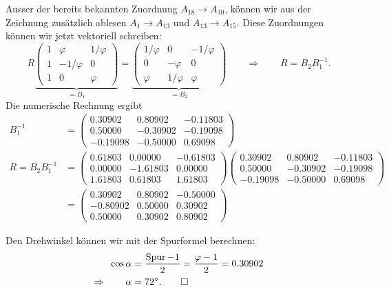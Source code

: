 \begin{loesung}
\begin{teilaufgaben}
\item
Ausser der bereits bekannten Zuordnung $A_{18}\rightarrow A_{10}$,
können wir aus der Zeichnung zusätzlich ablesen
$A_1\rightarrow A_{13}$
und
$A_{13}\rightarrow A_{15}$.
Diese Zuordnungen können wir jetzt vektoriell schreiben:
\begin{equation}
R
\underbrace{
\begin{pmatrix}
1&   \varphi&1/\varphi\\
1&-1/\varphi&        0\\
1&         0&  \varphi
\end{pmatrix}
}_{\displaystyle=B_1}
=
\underbrace{
\begin{pmatrix}
1/\varphi&        0&-1/\varphi\\
        0& -\varphi&         0\\
  \varphi&1/\varphi&   \varphi
\end{pmatrix}
}_{\displaystyle=B_2}
\qquad\Rightarrow\qquad
R=B_2B_1^{-1}.
\label{40000025:b1}
\end{equation}
Die numerische Rechnung ergibt
\begin{align*}
B_1^{-1}
&=
\begin{pmatrix}
   0.30902&  0.80902& -0.11803\\
   0.50000& -0.30902& -0.19098\\
  -0.19098& -0.50000&  0.69098
\end{pmatrix}
\\
R
=
B_2B_1^{-1}
&=
\begin{pmatrix}
   0.61803&  0.00000& -0.61803\\
   0.00000& -1.61803&  0.00000\\
   1.61803&  0.61803&  1.61803
\end{pmatrix}
\begin{pmatrix}
   0.30902&  0.80902& -0.11803\\
   0.50000& -0.30902& -0.19098\\
  -0.19098& -0.50000&  0.69098
\end{pmatrix}
\\
&=
\begin{pmatrix}
   0.30902&  0.80902& -0.50000\\
  -0.80902&  0.50000&  0.30902\\
   0.50000&  0.30902&  0.80902
\end{pmatrix}
\end{align*}
\item
Den Drehwinkel können wir mit der Spurformel berechnen:
\begin{align*}
\cos\alpha
&=
\frac{\operatorname{Spur}-1}{2}
=
\frac{\varphi-1}{2}
=
0.30902
\\
\Rightarrow\qquad
\alpha
&=
72^\circ.
\qedhere
\end{align*}
\end{teilaufgaben}
\end{loesung}


